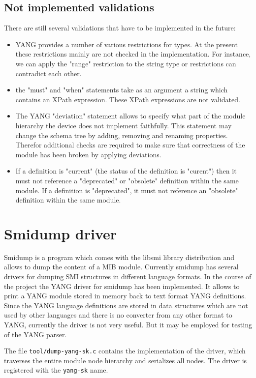 \documentclass[conference]{IEEEtran}
\begin{document}
\subsection{Not implemented validations}\label{notimpl}
There are still several validations that have to be implemented in the future:
\begin{itemize}
\item YANG provides a number of various restrictions for types. At the present these restrictions mainly are not checked in the implementation. 
For instance, we can apply the "range" restriction to the string type or restrictions can contradict each other.
\item the "must" and "when" statements take as an argument a string which contains an XPath expression. 
 These XPath expressions are not validated.
\item The YANG "deviation" statement allows to specify what part of the module hierarchy the device does not implement faithfully.
 This statement may change the schema tree by adding, removing and renaming properties. Therefor additional checks are required 
 to make sure that correctness of the module has been broken by applying deviations.
\item If a definition is "current" (the status of the definition is "curent") then it must not reference a "deprecated" or "obsolete" definition within the same module. 
If a definition is "deprecated", it must not reference an "obsolete" definition within the same module.  
\end{itemize}

\section{Smidump driver}
Smidump is a program which comes with the libsmi library distribution and allows to dump the content of a MIB module.
Currently smidump has several drivers for dumping SMI structures in different language formats.
In the course of the project the YANG driver for smidump has been implemented. 
It allows to print a YANG module stored in memory back to text format YANG definitions. 
Since the YANG language definitions are stored in data structures which are not used by other languages and there is no converter from any other format to YANG,
currently the driver is not very useful. But it may be employed for testing of the YANG parser.

The file \texttt{tool/dump-yang-sk.c} contains the implementation of the driver, which traverses the entire module node hierarchy and serializes all nodes. The driver is registered with the \texttt{yang-sk} name.
\end{document}
